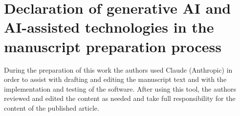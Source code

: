 \documentclass[preprint,12pt,number]{elsarticle}
\begin{document}
\section*{Declaration of generative AI and AI-assisted technologies in the
manuscript preparation process}
During the preparation of this work the authors used Claude (Anthropic) in
order to assist with drafting and editing the manuscript text and with the
implementation and testing of the software. After using this tool, the
authors reviewed and edited the content as needed and take full
responsibility for the content of the published article.

\appendix




\end{document}
